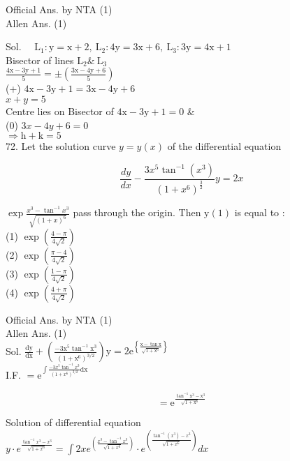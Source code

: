 \documentclass[10pt]{article}
\begin{document}
Official Ans. by NTA (1)\\
Allen Ans. (1)

Sol. \(\quad \mathrm{L}_{1}: \mathrm{y}=\mathrm{x}+2, \mathrm{~L}_{2}: 4 \mathrm{y}=3 \mathrm{x}+6, \mathrm{~L}_{3}: 3 \mathrm{y}=4 \mathrm{x}+1\)\\
Bisector of lines \(\mathrm{L}_{2} \& \mathrm{~L}_{3}\)\\
\(\frac{4 \mathrm{x}-3 \mathrm{y}+1}{5}= \pm\left(\frac{3 \mathrm{x}-4 \mathrm{y}+6}{5}\right)\)\\
(+) \(4 \mathrm{x}-3 \mathrm{y}+1=3 \mathrm{x}-4 \mathrm{y}+6\)\\
\(x+y=5\)\\
Centre lies on Bisector of \(4 \mathrm{x}-3 \mathrm{y}+1=0\) \&\\
(0) \(3 x-4 y+6=0\)\\
\(\Rightarrow \mathrm{h}+\mathrm{k}=5\)\\
72. Let the solution curve \(y=y(x)\) of the differential equation

\[
\frac{d y}{d x}-\frac{3 x^{5} \tan ^{-1}\left(x^{3}\right)}{\left(1+x^{6}\right)^{\frac{3}{2}}} y=2 x
\]

\(\exp \frac{x^{3}-\tan ^{-1} x^{3}}{\sqrt{(1+x)^{6}}}\) pass through the origin. Then \(\mathrm{y}(1)\) is equal to :\\
(1) \(\exp \left(\frac{4-\pi}{4 \sqrt{2}}\right)\)\\
(2) \(\exp \left(\frac{\pi-4}{4 \sqrt{2}}\right)\)\\
(3) \(\exp \left(\frac{1-\pi}{4 \sqrt{2}}\right)\)\\
(4) \(\exp \left(\frac{4+\pi}{4 \sqrt{2}}\right)\)

Official Ans. by NTA (1)\\
Allen Ans. (1)\\
Sol. \(\frac{\mathrm{dy}}{\mathrm{dx}}+\left(\frac{-3 \mathrm{x}^{5} \tan ^{-1} \mathrm{x}^{3}}{\left(1+\mathrm{x}^{6}\right)^{3 / 2}}\right) \mathrm{y}=2 \mathrm{e}^{\left\{\frac{\mathrm{x}-\tan \mathrm{x}}{\sqrt{1+\mathrm{x}^{6}}}\right\}}\)\\
I.F. \(=\mathrm{e}^{\int \frac{-3 x^{5} \tan ^{-1} x^{3}}{\left(1+x^{6}\right)^{3 / 2}} \mathrm{dx}}\)

\[
=\mathrm{e}^{\frac{\tan ^{-1} \mathrm{x}^{3}-\mathrm{x}^{3}}{\sqrt{1+\mathrm{x}^{6}}}}
\]

Solution of differential equation\\
\(y \cdot e^{\frac{\tan ^{-1} x^{3}-x^{3}}{\sqrt{1+x^{6}}}}=\int 2 x e^{\left(\frac{x^{3}-\tan ^{-1} x^{3}}{\sqrt{1+x^{6}}}\right)} \cdot e^{\left(\frac{\tan ^{-1}\left(x^{3}\right)-x^{3}}{\sqrt{1+x^{6}}}\right)} d x\)
\end{document}
